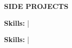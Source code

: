 


\vspace{\spaceBeforeSection}
\textbf{SIDE PROJECTS} \hrulefill
\vspace{\spaceAfterSection}

\sideProjA \hfill \sideProjADate 

\begin{small}
\textbf{Skills: \sideProjASkills} | \sideProjAFor
\end{small}

\medskip 

\sideProjB \hfill \sideProjBDate

\begin{small}
\textbf{Skills: \sideProjBSkills} | \sideProjBFor
\end{small}
